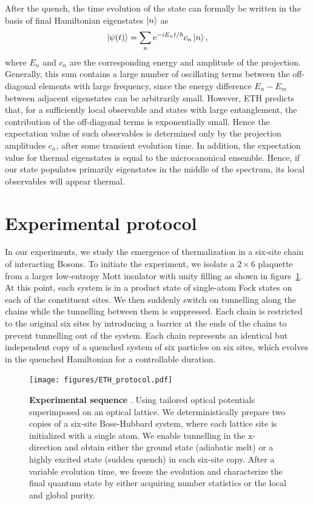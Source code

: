 After the quench, the time evolution of the state can formally be written in the basis of final Hamiltonian eigenstates $\left|n\right\rangle$ as
\begin{equation}
\left|\psi(t)\right\rangle=\sum_n e^{-iE_nt/\hbar}c_n\left|n\right\rangle,
\end{equation}
where $E_n$ and $c_n$ are the corresponding energy and amplitude of the projection. Generally, this sum contains a large number of oscillating terms between the off-diagonal elements with large frequency, since the energy difference $E_n-E_m$ between adjacent eigenstates can be arbitrarily small. However, ETH predicts that, for a sufficiently local observable and states with large entanglement, the contribution of the off-diagonal terms is exponentially small. Hence the expectation value of such observables is determined only by the projection amplitudes $c_n$, after some transient evolution time. In addition, the expectation value for thermal eigenstates is equal to the microcanonical ensemble. Hence, if our state populates primarily eigenstates in the middle of the spectrum, its local observables will appear thermal.  

\section{Experimental protocol}
In our experiments, we study the emergence of thermalization in a six-site chain of interacting Bosons. To initiate the experiment, we isolate a $2 \times 6$ plaquette from a larger low-entropy Mott insulator with unity filling as shown in figure~\ref{fig:ETH_protocol}. At this point, each system is in a product state of single-atom Fock states on each of the constituent sites. We then suddenly switch on tunnelling along the chains while the tunnelling between them is suppressed. Each chain is restricted to the original six sites by introducing a barrier at the ends of the chains to prevent tunnelling out of the system. Each chain represents an identical but independent copy of a quenched system of six particles on six sites, which evolves in the quenched Hamiltonian for a controllable duration.

\begin{figure}[t]
	\centering
	\texttt{[image: figures/ETH\_protocol.pdf]}
	\caption{{\bf Experimental sequence }. Using tailored optical potentials superimposed on an optical lattice. We deterministically prepare two copies of a six-site Bose-Hubbard system, where each lattice site is initialized with a single atom. We enable tunnelling in the x-direction and obtain either the ground state (adiabatic melt) or a highly excited state (sudden quench) in each six-site copy. After a variable evolution time, we freeze the evolution and characterize the final quantum state by either acquiring number statistics or the local and global purity.}
	
	\label{fig:ETH_protocol}
\end{figure} 

